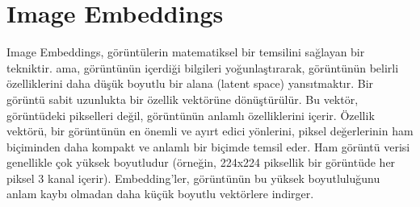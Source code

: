 \section{Image Embeddings}

Image Embeddings, görüntülerin matematiksel bir temsilini sağlayan bir tekniktir. ama, görüntünün içerdiği bilgileri yoğunlaştırarak, görüntünün belirli özelliklerini daha düşük boyutlu bir alana (latent space) yansıtmaktır. Bir görüntü sabit uzunlukta bir özellik vektörüne dönüştürülür. Bu vektör, görüntüdeki pikselleri değil, görüntünün anlamlı özelliklerini içerir. Özellik vektörü, bir görüntünün en önemli ve ayırt edici yönlerini, piksel değerlerinin ham biçiminden daha kompakt ve anlamlı bir biçimde temsil eder. Ham görüntü verisi genellikle çok yüksek boyutludur (örneğin, 224x224 piksellik bir görüntüde her piksel 3 kanal içerir). Embedding'ler, görüntünün bu yüksek boyutluluğunu anlam kaybı olmadan daha küçük boyutlu vektörlere indirger.

\newpage